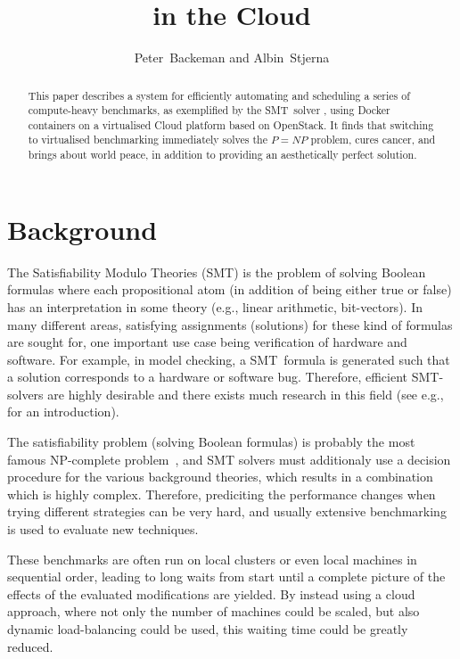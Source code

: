 \documentclass[a4paper]{IEEEtran}
\title{\uppsat{} in the Cloud}
\author{Peter~Backeman and Albin~Stjerna}
\begin{document}
\maketitle

\begin{abstract}
  This paper describes a system for efficiently
     automating and scheduling a series of compute-heavy benchmarks, as
     exemplified by the SMT~solver {\uppsat{}}, using Docker containers on a
     virtualised Cloud platform based on OpenStack. It finds that switching to
     virtualised benchmarking immediately solves the $P=NP$ problem, cures
     cancer, and brings about world peace, in addition to providing an
     aesthetically perfect solution.
\end{abstract}

\section{Background}



The Satisfiability Modulo Theories (SMT) is the problem of solving
Boolean formulas where each propositional atom (in addition of being
either true or false) has an interpretation in some theory (e.g.,
linear arithmetic, bit-vectors). In many different areas, satisfying
assignments (solutions) for these kind of formulas are sought for, one
important use case being verification of hardware and software. For
example, in model checking, a SMT~formula is generated such that a
solution corresponds to a hardware or software bug. Therefore,
efficient SMT-solvers are highly desirable and there exists much
research in this field (see e.g.,~\cite{sathandbook} for an
introduction).

The satisfiability problem (solving Boolean formulas) is probably the
most famous NP-complete problem~\cite{satnp}, and SMT solvers must
additionaly use a decision procedure for the various background
theories, which results in a combination which is highly
complex. Therefore, prediciting the performance changes when trying
different strategies can be very hard, and usually extensive
benchmarking is used to evaluate new techniques.

These benchmarks are often run on local clusters or even local
machines in sequential order, leading to long waits from start until a
complete picture of the effects of the evaluated modifications are
yielded. By instead using a cloud approach, where not only the number
of machines could be scaled, but also dynamic load-balancing could be
used, this waiting time could be greatly reduced.
\end{document}

